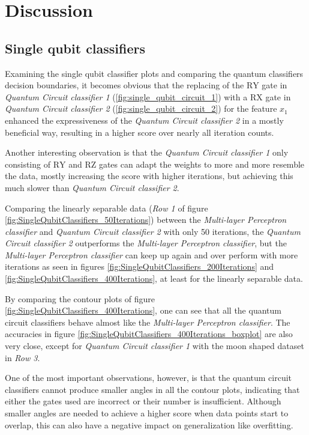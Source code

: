 \clearpage
\section{Discussion}

\subsection{Single qubit classifiers}
\label{subsection:single_qubit_circuits_discussion}
Examining the single qubit classifier plots and comparing the quantum classifiers decision boundaries, it becomes obvious that the replacing of the $\mathrm{RY}$ gate in \textit{Quantum Circuit classifier 1} (\ref{fig:single_qubit_circuit_1}) with a $\mathrm{RX}$ gate in \textit{Quantum Circuit classifier 2} (\ref{fig:single_qubit_circuit_2}) for the feature $x_1$ enhanced the expressiveness of the \textit{Quantum Circuit classifier 2} in a mostly beneficial way, resulting in a higher score over nearly all iteration counts.

Another interesting observation is that the \textit{Quantum Circuit classifier 1} only consisting of $\mathrm{RY}$ and $\mathrm{RZ}$ gates can adapt the weights to more and more resemble the data, mostly increasing the score with higher iterations, but achieving this much slower than \textit{Quantum Circuit classifier 2}. 

Comparing the linearly separable data (\textit{Row 1} of figure \ref{fig:SingleQubitClassifiers_50Iterations}) between the \textit{Multi-layer Perceptron classifier} and \textit{Quantum Circuit classifier 2} with only 50 iterations, the \textit{Quantum Circuit classifier 2} outperforms the \textit{Multi-layer Perceptron classifier}, but the \textit{Multi-layer Perceptron classifier} can keep up again and over perform with more iterations as seen in figures \ref{fig:SingleQubitClassifiers_200Iterations} and \ref{fig:SingleQubitClassifiers_400Iterations}, at least for the linearly separable data.

By comparing the contour plots of figure \ref{fig:SingleQubitClassifiers_400Iterations}, one can see that all the quantum circuit classifiers behave almost like the \textit{Multi-layer Perceptron classifier}. The accuracies in figure \ref{fig:SingleQubitClassifiers_400Iterations_boxplot} are also very close, except for \textit{Quantum Circuit classifier 1} with the moon shaped dataset in \textit{Row 3}.

One of the most important observations, however, is that the quantum circuit classifiers cannot produce smaller angles in all the contour plots, indicating that either the gates used are incorrect or their number is insufficient. Although smaller angles are needed to achieve a higher score when data points start to overlap, this can also have a negative impact on generalization like overfitting.


